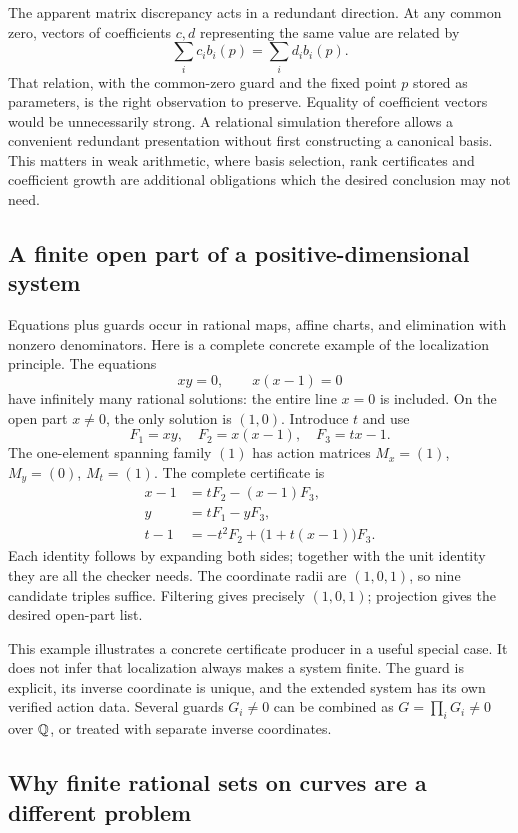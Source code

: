 The apparent matrix discrepancy acts in a redundant direction. At any
common zero, vectors of coefficients $c,d$ representing the same
value are related by
\[
                  \sum_i c_i b_i(p)=\sum_i d_i b_i(p).
\]
That relation, with the common-zero guard and the fixed point $p$
stored as parameters, is the right observation to preserve. Equality
of coefficient vectors would be unnecessarily strong. A relational
simulation therefore allows a convenient redundant presentation without
first constructing a canonical basis. This matters in weak arithmetic,
where basis selection, rank certificates and coefficient growth are
additional obligations which the desired conclusion may not need.

\subsection{A finite open part of a positive-dimensional system}

Equations plus guards occur in rational maps, affine charts, and
elimination with nonzero denominators. Here is a complete concrete
example of the localization principle.
The equations
\[
                xy=0,\qquad x(x-1)=0
\]
have infinitely many rational solutions: the entire line $x=0$ is
included. On the open part $x\ne0$, the only solution is $(1,0)$.
Introduce $t$ and use
\[
              F_1=xy,\quad F_2=x(x-1),\quad F_3=tx-1.
\]
The one-element spanning family $(1)$ has action matrices $M_x=(1)$,
$M_y=(0)$, $M_t=(1)$. The complete certificate is
\begin{align*}
 x-1&=tF_2-(x-1)F_3,\\
 y&=tF_1-yF_3,\\
 t-1&=-t^2F_2+\bigl(1+t(x-1)\bigr)F_3.
\end{align*}
Each identity follows by expanding both sides; together with the unit
identity they are all the checker needs. The coordinate radii are
$(1,0,1)$, so nine candidate triples suffice. Filtering gives precisely
$(1,0,1)$; projection gives the desired open-part list.

This example illustrates a concrete certificate producer in a useful
special case. It does not infer that localization always makes a system
finite. The guard is explicit, its inverse coordinate is unique, and
the extended system has its own verified action data. Several guards
$G_i\ne0$ can be combined as $G=\prod_iG_i\ne0$ over $\mathbb Q$,
or treated with separate inverse coordinates.

\subsection{Why finite rational sets on curves are a different problem}

